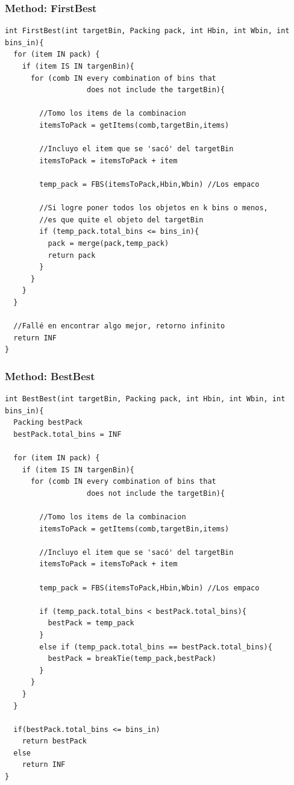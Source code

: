 \documentclass[a4paper,10pt]{article}
\begin{document}
\subsubsection{Method: FirstBest}
\begin{verbatim}
int FirstBest(int targetBin, Packing pack, int Hbin, int Wbin, int bins_in){
  for (item IN pack) {
    if (item IS IN targenBin){
      for (comb IN every combination of bins that
                   does not include the targetBin){

        //Tomo los items de la combinacion
        itemsToPack = getItems(comb,targetBin,items)

        //Incluyo el item que se 'sacó' del targetBin
        itemsToPack = itemsToPack + item

        temp_pack = FBS(itemsToPack,Hbin,Wbin) //Los empaco

        //Si logre poner todos los objetos en k bins o menos,
        //es que quite el objeto del targetBin
        if (temp_pack.total_bins <= bins_in){
          pack = merge(pack,temp_pack)
          return pack
        }
      }
    }
  }

  //Fallé en encontrar algo mejor, retorno infinito
  return INF
}
\end{verbatim}

\subsubsection{Method: BestBest}
\begin{verbatim}
int BestBest(int targetBin, Packing pack, int Hbin, int Wbin, int bins_in){
  Packing bestPack
  bestPack.total_bins = INF

  for (item IN pack) {
    if (item IS IN targenBin){
      for (comb IN every combination of bins that
                   does not include the targetBin){

        //Tomo los items de la combinacion
        itemsToPack = getItems(comb,targetBin,items)

        //Incluyo el item que se 'sacó' del targetBin
        itemsToPack = itemsToPack + item

        temp_pack = FBS(itemsToPack,Hbin,Wbin) //Los empaco

        if (temp_pack.total_bins < bestPack.total_bins){
          bestPack = temp_pack
        }
        else if (temp_pack.total_bins == bestPack.total_bins){
          bestPack = breakTie(temp_pack,bestPack)
        }
      }
    }
  }

  if(bestPack.total_bins <= bins_in)
    return bestPack
  else
    return INF
}
\end{verbatim}
\end{document}
